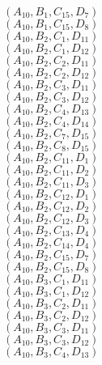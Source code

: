 \documentclass[14pt]{article}
\begin{document}
    $({A}_{10}, {B}_{1}, {C}_{15}, {D}_{7}) $ \\ 
    $({A}_{10}, {B}_{1}, {C}_{15}, {D}_{8}) $ \\ 
    $({A}_{10}, {B}_{2}, {C}_{1}, {D}_{11}) $ \\ 
    $({A}_{10}, {B}_{2}, {C}_{1}, {D}_{12}) $ \\ 
    $({A}_{10}, {B}_{2}, {C}_{2}, {D}_{11}) $ \\ 
    $({A}_{10}, {B}_{2}, {C}_{2}, {D}_{12}) $ \\ 
    $({A}_{10}, {B}_{2}, {C}_{3}, {D}_{11}) $ \\ 
    $({A}_{10}, {B}_{2}, {C}_{3}, {D}_{12}) $ \\ 
    $({A}_{10}, {B}_{2}, {C}_{4}, {D}_{13}) $ \\ 
    $({A}_{10}, {B}_{2}, {C}_{4}, {D}_{14}) $ \\ 
    $({A}_{10}, {B}_{2}, {C}_{7}, {D}_{15}) $ \\ 
    $({A}_{10}, {B}_{2}, {C}_{8}, {D}_{15}) $ \\ 
    $({A}_{10}, {B}_{2}, {C}_{11}, {D}_{1}) $ \\ 
    $({A}_{10}, {B}_{2}, {C}_{11}, {D}_{2}) $ \\ 
    $({A}_{10}, {B}_{2}, {C}_{11}, {D}_{3}) $ \\ 
    $({A}_{10}, {B}_{2}, {C}_{12}, {D}_{1}) $ \\ 
    $({A}_{10}, {B}_{2}, {C}_{12}, {D}_{2}) $ \\ 
    $({A}_{10}, {B}_{2}, {C}_{12}, {D}_{3}) $ \\ 
    $({A}_{10}, {B}_{2}, {C}_{13}, {D}_{4}) $ \\ 
    $({A}_{10}, {B}_{2}, {C}_{14}, {D}_{4}) $ \\ 
    $({A}_{10}, {B}_{2}, {C}_{15}, {D}_{7}) $ \\ 
    $({A}_{10}, {B}_{2}, {C}_{15}, {D}_{8}) $ \\ 
    $({A}_{10}, {B}_{3}, {C}_{1}, {D}_{11}) $ \\ 
    $({A}_{10}, {B}_{3}, {C}_{1}, {D}_{12}) $ \\ 
    $({A}_{10}, {B}_{3}, {C}_{2}, {D}_{11}) $ \\ 
    $({A}_{10}, {B}_{3}, {C}_{2}, {D}_{12}) $ \\ 
    $({A}_{10}, {B}_{3}, {C}_{3}, {D}_{11}) $ \\ 
    $({A}_{10}, {B}_{3}, {C}_{3}, {D}_{12}) $ \\ 
    $({A}_{10}, {B}_{3}, {C}_{4}, {D}_{13}) $ \\ 
\end{document}
